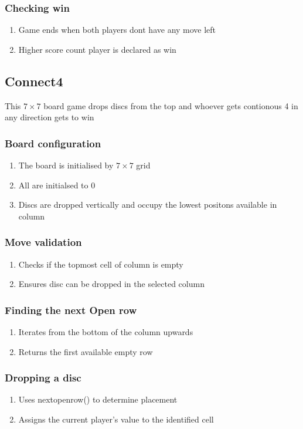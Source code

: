 \documentclass{article}
\begin{document}
\subsubsection{Checking win}
\begin{enumerate}
    \item Game ends when both players dont have any move left
    \item Higher score count player is declared as win
\end{enumerate}
\subsection{Connect4}
This $7 \times 7$ board game drops discs from the top and whoever gets contionous 4 in any direction gets to win
\subsubsection{Board configuration}
\begin{enumerate}
    \item The board is initialised by $7 \times 7$ grid
    \item All are initialsed to 0
    \item Discs are dropped vertically and occupy the lowest positons available in column 
\end{enumerate}
\subsubsection{Move validation}
\begin{enumerate}
    \item Checks if the topmost cell of column is empty
    \item Ensures disc can be dropped in the selected column
\end{enumerate}
\subsubsection{Finding the next Open row}
\begin{enumerate}
    \item Iterates from the bottom of the column upwards
    \item Returns the first available empty row
\end{enumerate}
\subsubsection{Dropping a disc}
\begin{enumerate}
    \item Uses nextopenrow() to determine placement
    \item Assigns the current player's value to the identified cell
\end{enumerate}
\end{document}
